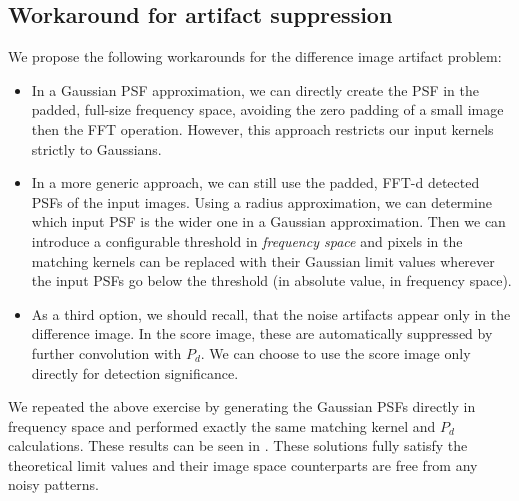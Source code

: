 \subsection{Workaround for artifact suppression\label{sec:workaround}}
We propose the following workarounds for the difference image artifact
problem:
\begin{itemize}
  \item In a Gaussian PSF approximation, we can directly create the
    PSF in the padded, full-size frequency space, avoiding the zero
    padding of a small image then the FFT operation. However, this
    approach restricts our input kernels strictly to Gaussians.
  \item In a more generic approach, we can still use the padded, FFT-d
    detected PSFs of the input images. Using a radius approximation, we
    can determine which input PSF is the wider one in a Gaussian
    approximation. Then we can introduce a configurable threshold in
    \emph{frequency space} and pixels in the matching kernels can be
    replaced with their Gaussian limit values wherever the input PSFs
    go below the threshold (in absolute value, in frequency space).
  \item As a third option, we should recall, that the noise artifacts
    appear only in the difference image. In the score image, these are
    automatically suppressed by further convolution with \(P_d\). We
    can choose to use the score image only directly for detection
    significance.
\end{itemize}
%
\par We repeated the above exercise by generating the Gaussian PSFs directly
in frequency space and performed exactly the same matching kernel and
\(P_d\) calculations. These results can be seen in
. These
solutions fully satisfy the theoretical limit values and their image space
counterparts are free from any noisy patterns.
%

